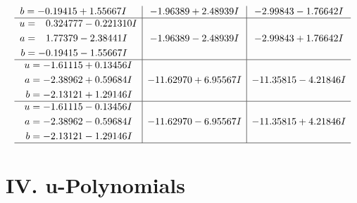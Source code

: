 \documentclass[1p]{elsarticle_modified}
\theoremstyle{definition}
\begin{document}
$$\begin{array}{c|c|c}
\begin{aligned}
b &= -0.19415 + 1.55667 I\end{aligned}
 & -1.96389 + 2.48939 I & -2.99843 - 1.76642 I \\ \hline\begin{aligned}
u &= \phantom{-}0.324777 - 0.221310 I \\
a &= \phantom{-}1.77379 - 2.38441 I \\
b &= -0.19415 - 1.55667 I\end{aligned}
 & -1.96389 - 2.48939 I & -2.99843 + 1.76642 I \\ \hline\begin{aligned}
u &= -1.61115 + 0.13456 I \\
a &= -2.38962 + 0.59684 I \\
b &= -2.13121 + 1.29146 I\end{aligned}
 & -11.62970 + 6.95567 I & -11.35815 - 4.21846 I \\ \hline\begin{aligned}
u &= -1.61115 - 0.13456 I \\
a &= -2.38962 - 0.59684 I \\
b &= -2.13121 - 1.29146 I\end{aligned}
 & -11.62970 - 6.95567 I & -11.35815 + 4.21846 I\\
 \hline 
 \end{array}$$\newpage
\newpage\renewcommand{\arraystretch}{1}
\centering \section*{ IV. u-Polynomials}
\end{document}

